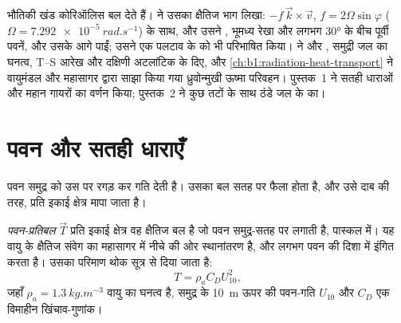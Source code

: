 \begin{recall}
भौतिकी खंड कोरिऑलिस बल देते हैं।  ने उसका क्षैतिज भाग लिखा: $-f\,\vec k\times\vec v$, 
$f = 2\Omega\sin\varphi$ ($\Omega = \qty{7.292e-5}{rad.s^{-1}}$) के साथ, और उसने , भूमध्य रेखा और लगभग \ang{30} के बीच पूर्वी पवनें, और उसके आगे  पाईं; उसने एक पलटाव के  को भी परिभाषित किया।  ने  और , समुद्री जल का घनत्व, T--S आरेख और दक्षिणी अटलांटिक के  दिए, और \cref{ch:b1:radiation-heat-transport} ने वायुमंडल और महासागर द्वारा साझा किया गया ध्रुवोन्मुखी ऊष्मा परिवहन। पुस्तक~1 ने सतही धाराओं और महान गायरों का वर्णन किया; पुस्तक~2 ने कुछ तटों के साथ ठंडे जल के  का।
\end{recall}

\section{पवन और सतही धाराएँ}\label{sec:b1:ocean-circulation:wind}

पवन समुद्र को उस पर रगड़ कर गति देती है। उसका बल सतह पर फैला होता है, और उसे दाब की तरह, प्रति इकाई क्षेत्र मापा जाता है।

\begin{definition}[पवन-प्रतिबल]\label{def:b1:ocean-circulation:wind-stress}
\emph{पवन-प्रतिबल} $\vec T$ प्रति इकाई क्षेत्र वह क्षैतिज बल है जो पवन समुद्र-सतह पर लगाती है, पास्कल में। यह वायु के क्षैतिज संवेग का महासागर में नीचे की ओर स्थानांतरण है, और लगभग पवन की दिशा में इंगित करता है। उसका परिमाण थोक सूत्र से दिया जाता है:
\[
  T = \rho_a C_D U_{10}^2,
\]
जहाँ $\rho_a = \qty{1.3}{kg.m^{-3}}$ वायु का घनत्व है, समुद्र के \qty{10}{m} ऊपर की पवन-गति $U_{10}$ और $C_D$ एक विमाहीन खिंचाव-गुणांक।
\end{definition}

